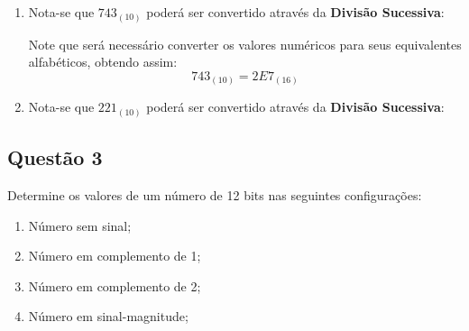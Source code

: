 \documentclass{article}
\begin{document}
\begin{resolution}
\begin{enumerate}[rightmargin = \leftmargin]
                    \item Nota-se que $743_{(10)}$ poderá ser convertido através da \textbf{Divisão Sucessiva}:
                        \begin{figure}[H]
                            \centering
                        \end{figure}
                    Note que será necessário converter os valores numéricos para seus equivalentes alfabéticos, obtendo assim:
                        \begin{equation*}
                            \boxed{743_{(10)} = 2E7_{(16)}}
                        \end{equation*}

                    \item Nota-se que $221_{(10)}$ poderá ser convertido através da \textbf{Divisão Sucessiva}:
                        \begin{figure}[H]
                            \centering
                        \end{figure}
                \end{enumerate}
            \end{resolution}
\newpage

        \subsection{Questão 3}
            \begin{exercise}
                Determine os valores de um número de 12 bits nas seguintes configurações:
                    \begin{enumerate}[noitemsep]
                        \item Número sem sinal;
                        \item Número em complemento de 1;
                        \item Número em complemento de 2;
                        \item Número em sinal-magnitude;
                    \end{enumerate}
            \end{exercise}
            \begin{resolution}

            \end{resolution}
\newpage
\end{document}
